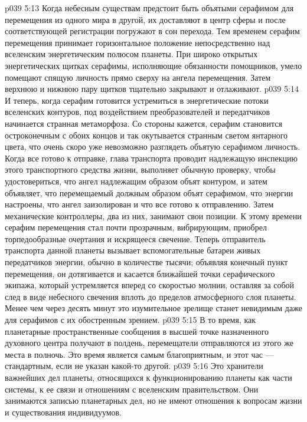 \vs p039 5:13 \pc Когда небесным существам предстоит быть объятыми серафимом для перемещения из одного мира в другой, их доставляют в центр сферы и после соответствующей регистрации погружают в сон перехода. Тем временем серафим перемещения принимает горизонтальное положение непосредственно над вселенским энергетическим полюсом планеты. При широко открытых энергетических щитках серафимы, исполняющие обязанности помощников, умело помещают спящую личность прямо сверху на ангела перемещения. Затем верхнюю и нижнюю пару щитков тщательно закрывают и отлаживают.
\vs p039 5:14 И теперь, когда серафим готовится устремиться в энергетические потоки вселенских контуров, под воздействием преобразователей и передатчиков начинается странная метаморфоза. Со стороны кажется, серафим становится остроконечным с обоих концов и так окутывается странным светом янтарного цвета, что очень скоро уже невозможно разглядеть объятую серафимом личность. Когда все готово к отправке, глава транспорта проводит надлежащую инспекцию этого транспортного средства жизни, выполняет обычную проверку, чтобы удостовериться, что ангел надлежащим образом объят контуром, и затем объявляет, что перемещаемый должным образом объят серафимом, что энергии настроены, что ангел заизолирован и что все готово к отправлению. Затем механические контроллеры, два из них, занимают свои позиции. К этому времени серафим перемещения стал почти прозрачным, вибрирующим, приобрел торпедообразные очертания и искрящееся свечение. Теперь отправитель транспорта данной планеты вызывает вспомогательные батареи живых передатчиков энергии, обычно в количестве тысячи; объявляя конечный пункт перемещения, он дотягивается и касается ближайшей точки серафического экипажа, который устремляется вперед со скоростью молнии, оставляя за собой след в виде небесного свечения вплоть до пределов атмосферного слоя планеты. Менее чем через десять минут это изумительное зрелище станет невидимым даже для серафимов с их обостренным зрением.
\vs p039 5:15 \pc В то время, как планетарные пространственные сообщения в высшей точке назначенного духовного центра получают в полдень, перемещатели отправляются из этого же места в полночь. Это время является самым благоприятным, и этот час --- стандартным, если не указан какой\hyp{}то другой.
\vs p039 5:16 \bibnobreakspace {} Это хранители важнейших дел планеты, относящихся к функционированию планеты как части системы, к ее связи и отношениям с вселенским правительством. Они занимаются записью планетарных дел, но не имеют отношения к вопросам жизни и существования индивидуумов.
